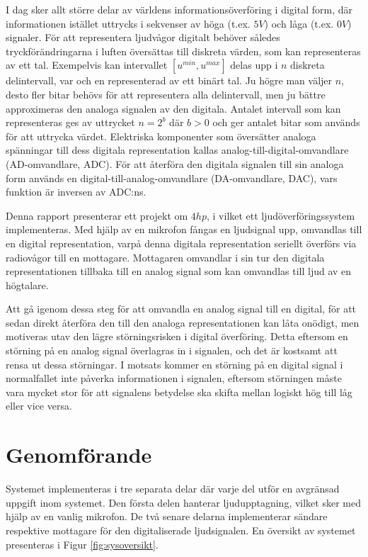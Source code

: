 \documentclass[a4paper,10pt]{article}
\begin{document}
I dag sker allt större delar av världens informationsöverföring i digital form, 
där informationen istället uttrycks i sekvenser av höga (t.ex. $5V$) och låga
(t.ex. $0V$) signaler. För att representera ljudvågor digitalt behöver således 
tryckförändringarna i luften översättas till diskreta värden, som kan 
representeras av ett tal.
Exempelvis kan intervallet $[u^{min}, u^{max}]$ delas upp i $n$ diskreta 
delintervall, var och en representerad av ett binärt tal. Ju högre man väljer
$n$, desto fler bitar behövs för att representera alla delintervall, men ju
bättre approximeras den analoga signalen av den digitala. Antalet intervall som 
kan representeras ges av uttrycket $n = 2^b$ där $b > 0$ och ger antalet bitar 
som används för att uttrycka värdet. Elektriska komponenter som översätter 
analoga spänningar till dess digitala representation kallas 
analog-till-digital-omvandlare (AD-omvandlare, ADC). 
För att återföra den digitala signalen till sin analoga form används en
digital-till-analog-omvandlare (DA-omvandlare, DAC), vars funktion är
inversen av ADC:ns. 

Denna rapport presenterar ett projekt om $4 hp$, i vilket ett 
ljudöverföringssystem implementeras. Med hjälp av en mikrofon fångas en 
ljudsignal upp, omvandlas till en digital representation, varpå denna digitala 
representation seriellt överförs via radiovågor till en mottagare. Mottagaren 
omvandlar i sin tur den digitala representationen tillbaka till en analog signal 
som kan omvandlas till ljud av en högtalare.

Att gå igenom dessa steg för att omvandla en analog signal till en digital, för
att sedan direkt återföra den till den analoga representationen kan låta 
onödigt, men motiveras utav den lägre störningsrisken i digital överföring. 
Detta eftersom en störning på en analog signal överlagras in i signalen, och
det är kostsamt att rensa ut dessa störningar. I motsats kommer en störning på
en digital signal i normalfallet inte påverka informationen i signalen, eftersom
störningen måste vara mycket stor för att signalens betydelse ska skifta mellan 
logiskt hög till låg eller vice versa.


\section{Genomförande}

Systemet implementeras i tre separata delar där varje del utför en avgränsad 
uppgift inom systemet. Den första delen hanterar ljudupptagning, vilket sker med
hjälp av en vanlig mikrofon. De två senare delarna implementerar sändare
respektive mottagare för den digitaliserade ljudsignalen. En översikt av 
systemet presenteras i Figur \ref{fig:sysoversikt}.
\end{document}
